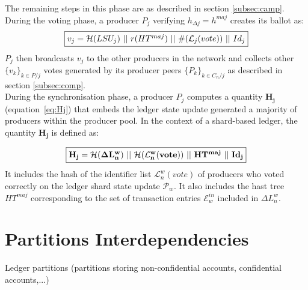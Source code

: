 The remaining steps in this phase are as described in section \ref{subsec:camp}.\\

During the voting phase, a producer $P_j$ verifying $h_{\Delta j}=h^{maj}$ creates its ballot as:
\begin{equation}
\label{eq:vj_shard}
\fbox{$v_j = \mathcal{H}(LSU_j)~||~r(HT^{maj})~||~\#(\mathcal{L}_j(vote))~||~Id_j$}
\end{equation}
$P_j$ then broadcasts $v_j$ to the other producers in the network and collects other $\{v_k\}_{k \in P/j}$ votes generated by its producer peers $\{P_k\}_{k \in C_n/j}$ as described in section \ref{subsec:comp}.\\

During the synchronisation phase, a producer $P_j$ computes a quantity $\mathbf{H_{j}}$ (equation~\eqref{eq:Hj}) that embeds the ledger state update generated a majority of producers within the producer pool. In the context of a shard-based ledger, the  quantity $\mathbf{H_{j}}$ is defined as:

 \begin{equation} 
\fbox{$\mathbf{H_{j} = \mathcal{H}(\Delta L^w_n)~||~\mathcal{H}(\mathcal{L}^{w}_{n}(vote))~||~HT^{maj}~||~Id_j}$}
\label{eq:Hj_shard}
\end{equation}
It includes the hash of the identifier list $\mathcal{L}^{w}_{n}(vote)$ of producers who voted correctly on the ledger shard state update $\mathcal{P}_w$.
It also includes the hast tree $HT^{maj}$ corresponding to the set of transaction entries $\mathcal{E}^{in}_w$ included in $\Delta L^w_n$. 


\section{Partitions Interdependencies}

Ledger partitions (partitions storing non-confidential accounts, confidential accounts,...)
